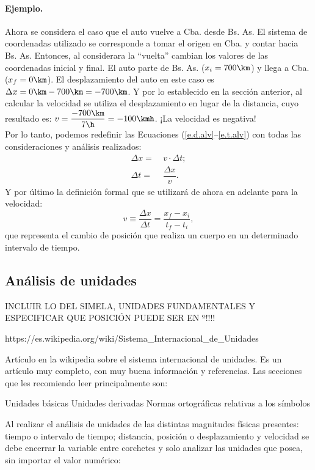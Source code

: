\paragraph{Ejemplo.} Ahora se considera el caso que el auto vuelve a Cba. desde
Bs. As. El sistema de coordenadas utilizado se corresponde a tomar el origen en
Cba. y contar hacia Bs. As. Entonces, al considerara la ``vuelta'' cambian los
valores de las coordenadas inicial y final. El auto parte de Bs. As.
($x_i=700\km$) y llega a Cba. ($x_f=0\km$). El desplazamiento del auto en este
caso es $\Delta x= 0\km - 700\km=-700\km$. Y por lo establecido en la sección
anterior, al calcular la velocidad se utiliza el desplazamiento en lugar de la
distancia, cuyo resultado es: $v=\dfrac{-700\km}{7\h}=-100\kmh$. ¡La velocidad
es negativa! \finej \\

Por lo tanto, podemos redefinir las Ecuaciones  (\ref{e.d.alv}--\ref{e.t.alv})
con todas las consideraciones y análisis realizados:
\begin{align}  
  \Delta x = &\: v \cdot \Delta t; \label{e.mov} \\
  \Delta t = & \: \dfrac{\Delta x}{v}.  \label{e.t}
\end{align}
Y por último la definición formal que se utilizará de ahora en adelante para la
velocidad:
\begin{equation}
  \boxed{v \equiv \dfrac{\Delta x}{\Delta t} = \dfrac{x_f - x_i}{t_f - t_i}},
  \label{e.v}
\end{equation}
que representa el cambio de posición que realiza un cuerpo en un determinado
intervalo de tiempo.


\subsection{Análisis de unidades}
\label{c.anu}


INCLUIR LO DEL SIMELA, UNIDADES FUNDAMENTALES Y ESPECIFICAR QUE POSICIÓN PUEDE
SER EN º!!!!

https://es.wikipedia.org/wiki/Sistema\_Internacional\_de\_Unidades

Artículo en la wikipedia sobre el sistema internacional de unidades. Es un artículo muy completo, con muy buena información y referencias. Las secciones que les recomiendo leer principalmente son:

    Unidades básicas
    Unidades derivadas
    Normas ortográficas relativas a los símbolos


Al realizar el análisis de unidades de las distintas magnitudes físicas
presentes: tiempo o intervalo de tiempo; distancia, posición o desplazamiento y
velocidad se debe encerrar la variable entre corchetes y solo analizar las
unidades que posea, sin importar el valor numérico: 

